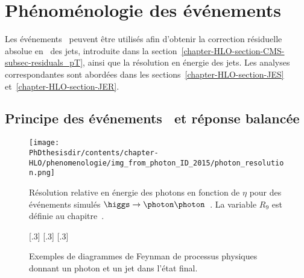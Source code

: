 \section{Phénoménologie des événements \Gjets}\label{chapter-HLO-section-pheno-GJets}
Les événements \Gjets\ peuvent être utilisés afin d'obtenir la correction résiduelle absolue en \pT\ des jets, introduite dans la section~\ref{chapter-HLO-section-CMS-subsec-residuals_pT}, ainsi que la résolution en énergie des jets. Les analyses correspondantes sont abordées dans les sections~\ref{chapter-HLO-section-JES} et~\ref{chapter-HLO-section-JER}.
\subsection{Principe des événements \Gjets\ et réponse balancée}
\begin{figure}[p]
\centering
\texttt{[image: \\PhDthesisdir/contents/chapter-HLO/phenomenologie/img\_from\_photon\_ID\_2015/photon\_resolution.png]}
\caption[Résolution en énergie des photons.]{Résolution relative en énergie des photons en fonction de $\eta$ pour des événements simulés $\higgs\to\photon\photon$~\cite{photon_ID_2015}. La variable $R_9$ est définie au chapitre~.}
\label{fig-chapter-HLO-section-pheno-GJets-photon_resolution}
\end{figure}
\begin{figure}[p]
\centering\vspace{\baselineskip}
\subcaptionbox{\label{subfig-fgraph-gq_qGamma_S}}[.3\textwidth]
{\vspace{\baselineskip}}
\hfill
\subcaptionbox{\label{subfig-fgraph-gq_qGamma_T}}[.3\textwidth]
{\vspace{\baselineskip}}
\hfill
\subcaptionbox{\label{subfig-fgraph-qq_gGamma}}[.3\textwidth]
{\vspace{\baselineskip}}
\caption[Diagrammes de Feynman donnant un photon et un jet dans l'état final.]{Exemples de diagrammes de Feynman de processus physiques donnant un photon et un jet dans l'état final.}
\label{fig-fgraph-gamma_plus_jets}
\end{figure}
